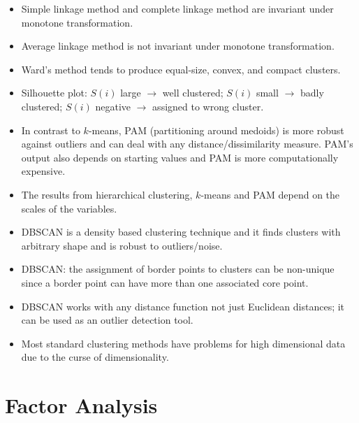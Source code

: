 \documentclass[a4paper]{article}
\begin{document}
\begin{itemize}
    \item Simple linkage method and complete linkage method are invariant under monotone transformation.
    \item Average linkage method is not invariant under monotone transformation.
    \item Ward's method tends to produce equal-size, convex, and compact clusters.
    \item Silhouette plot: $S(i)$ large $\to$ well clustered; $S(i)$ small $\to$ badly clustered; $S(i)$ negative $\to$ assigned to wrong cluster.
    \item In contrast to $k$-means, PAM (partitioning around medoids) is more robust against outliers and can deal with any distance/dissimilarity measure. PAM's output also depends on starting values and PAM is more computationally expensive.
    \item The results from hierarchical clustering, $k$-means and PAM depend on the scales of the variables.
    \item DBSCAN is a density based clustering technique and it finds clusters with arbitrary shape and is robust to outliers/noise.
    \item DBSCAN: the assignment of border points to clusters can be non-unique since a border point can have more than one associated core point.
    \item DBSCAN works with any distance function not just Euclidean distances; it can be used as an outlier detection tool.
    \item Most standard clustering methods have problems for high dimensional data due to the curse of dimensionality.
\end{itemize}

\section{Factor Analysis}
\end{document}
